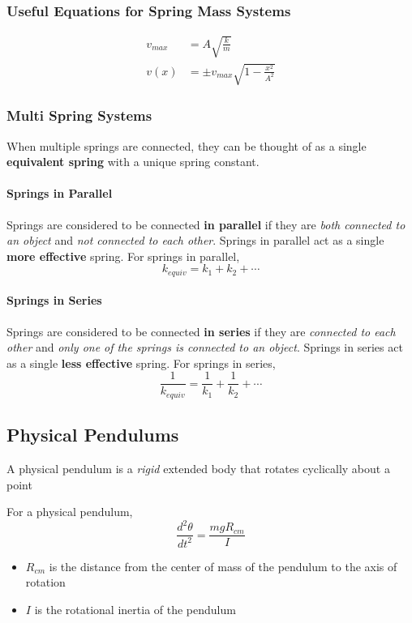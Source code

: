 \documentclass[titlepage]{article}
\begin{document}
\subsubsection{Useful Equations for Spring Mass Systems}
\begin{align*}
    v_{max} &= A \sqrt{\frac{k}{m}} \\
    v(x) &= \pm v_{max} \sqrt{1 - \frac{x^2}{A^2}}
\end{align*}

\subsubsection{Multi Spring Systems}
When multiple springs are connected, they can be thought of as a single \textbf{equivalent spring} with a unique spring constant.

\paragraph{Springs in Parallel}
Springs are considered to be connected \textbf{in parallel} if they are \emph{both connected to an object} and \emph{not connected to each other}. Springs in parallel act as a single \textbf{more effective} spring. For springs in parallel,
\begin{equation*}
    k_{equiv} = k_1 + k_2 + \cdots
\end{equation*}

\paragraph{Springs in Series}
Springs are considered to be connected \textbf{in series} if they are \emph{connected to each other} and \emph{only one of the springs is connected to an object}. Springs in series act as a single \textbf{less effective} spring. For springs in series,
\begin{equation*}
    \frac{1}{k_{equiv}} = \frac{1}{k_1} + \frac{1}{k_2} + \cdots
\end{equation*}

\subsection{Physical Pendulums}
A physical pendulum is a \emph{rigid} extended body that rotates cyclically about a point

For a physical pendulum,
\begin{equation*}
    \frac{d^2 \theta}{dt^2} = \frac{mg R_{cm}}{I}
\end{equation*}
\begin{itemize}
    \item $R_{cm}$ is the distance from the center of mass of the pendulum to the axis of rotation
    \item $I$ is the rotational inertia of the pendulum
\end{itemize}
\end{document}
